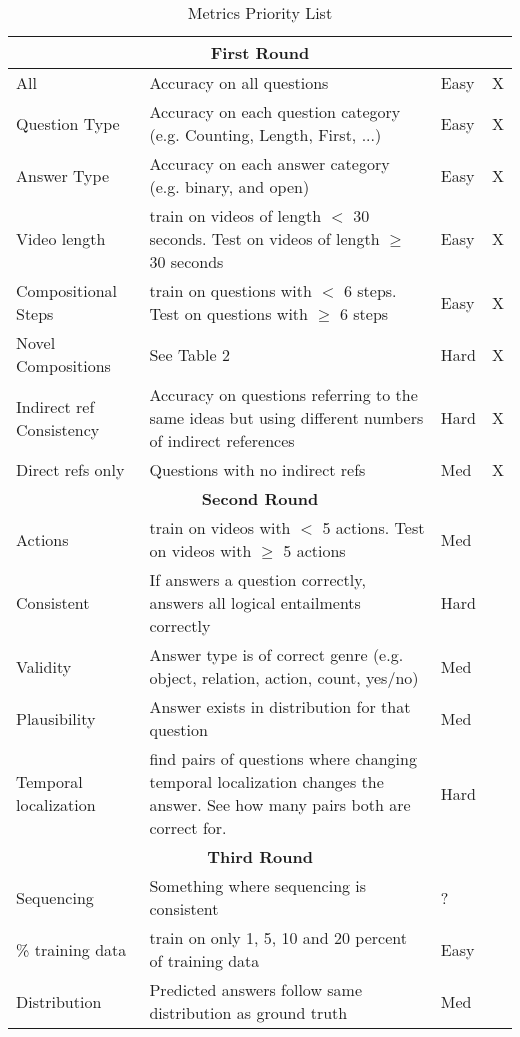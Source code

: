 \documentclass{article}
\begin{document}
\begin{table}[]
    \begin{center}
    \caption{Metrics Priority List}
    \label{tab:table1}
    \begin{tabular}{|p{2cm}|p{10cm}|p{.8cm}|p{.5cm}|}
     \hline
     \multicolumn{4}{|c|}{\textbf{First Round}}\\
    \hline
    All & Accuracy on all questions & Easy & X \\
    \hline
    Question Type & Accuracy on each question category (e.g. Counting, Length, First, ...) & Easy & X \\
    \hline
    Answer Type & Accuracy on each answer category (e.g. binary, and open) & Easy & X \\
    \hline
    Video length & train on videos of length $<$ 30 seconds. Test on videos of length $\geq$ 30 seconds & Easy &  X \\
    \hline
    Compositional Steps &  train on questions with $<$ 6 steps. Test on questions with $\geq$ 6 steps & Easy & X \\
    \hline
    Novel Compositions & See Table 2 & Hard  & X \\
    \hline
    Indirect ref Consistency & Accuracy on questions referring to the same ideas but using different numbers of indirect references & Hard  & X \\
    \hline
    Direct refs only & Questions with no indirect refs & Med & X\\
    \hline
    
    
     \multicolumn{4}{|c|}{\textbf{Second Round}}\\
    \hline
    Actions & train on videos with $<$ 5 actions. Test on videos with $\geq$ 5 actions & Med  &  \\
    \hline
    Consistent & If answers a question correctly, answers all logical entailments correctly & Hard &  \\
    \hline
    Validity & Answer type is of correct genre (e.g. object, relation, action, count, yes/no) & Med & \\
    \hline
    Plausibility  & Answer exists in distribution for that question & Med & \\
    \hline
     Temporal localization & find pairs of questions where changing temporal localization changes the answer. See how many pairs both are correct for. & Hard  & \\
     \hline
    
    
     \multicolumn{4}{|c|}{\textbf{Third Round}}\\
    \hline
    Sequencing & Something where sequencing is consistent & ?  & \\
    \hline
    \% training data & train on only 1, 5, 10 and 20 percent of training data  & Easy & \\
    \hline
    Distribution & Predicted answers follow same distribution as ground truth & Med & \\
    \hline
    \end{tabular}
    \end{center}
\end{table}
\end{document}
